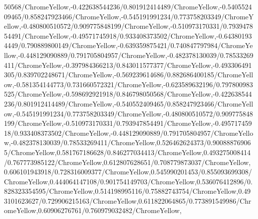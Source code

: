 {\begin{tikzternal}
{50568/ChromeYellow,-0.422638544236/0.801912414489/ChromeYellow,-0.540552409465/0.858247923466/ChromeYellow,-0.545191991234/0.773758203349/ChromeYellow,-0.480800510572/0.909775848199/ChromeYellow,-0.510973170331/0.793947854491/ChromeYellow,-0.49571745918/0.933408373502/ChromeYellow,-0.643801934449/0.790889800149/ChromeYellow,-0.639359875421/0.740847797984/ChromeYellow,-0.448129090889/0.791705804957/ChromeYellow,-0.482378130039/0.78533269411/ChromeYellow,-0.397984366213/0.843011577377/ChromeYellow,-0.493306491305/0.839702248671/ChromeYellow,-0.569239614686/0.882686400185/ChromeYellow,-0.581354144773/0.731660572321/ChromeYellow,-0.623589632196/0.797800983525/ChromeYellow,-0.598692921918/0.846798050568/ChromeYellow,-0.422638544236/0.801912414489/ChromeYellow,-0.540552409465/0.858247923466/ChromeYellow,-0.545191991234/0.773758203349/ChromeYellow,-0.480800510572/0.909775848199/ChromeYellow,-0.510973170331/0.793947854491/ChromeYellow,-0.49571745918/0.933408373502/ChromeYellow,-0.448129090889/0.791705804957/ChromeYellow,-0.482378130039/0.78533269411/ChromeYellow,0.526462624373/0.900888769065/ChromeYellow,0.581767186628/0.846277034413/ChromeYellow,0.493275008414/0.767773985122/ChromeYellow,0.612807628651/0.708779873037/ChromeYellow,0.606101943918/0.728316009377/ChromeYellow,0.545990201453/0.855093699308/ChromeYellow,0.444064147108/0.901754149703/ChromeYellow,0.536076412896/0.828323354595/ChromeYellow,0.514198995116/0.75882743754/ChromeYellow,0.493101623627/0.729906215163/ChromeYellow,0.611822064865/0.773891549986/ChromeYellow,0.60906276761/0.760979032482/ChromeYellow,
}
\end{tikzternal}}
